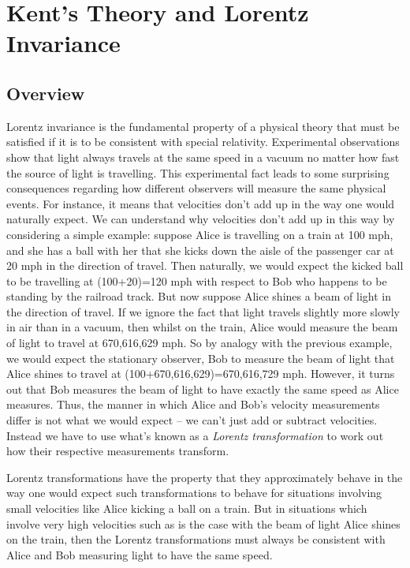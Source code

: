 \section{Kent's Theory and Lorentz Invariance\label{LorentzInvariance}}
\subsection{Overview}
Lorentz invariance is the fundamental property of a physical theory that must be satisfied if it is to be consistent with special relativity. Experimental observations show that light always travels at the same speed in a vacuum no matter how fast the source of light is travelling. This experimental fact leads to some surprising consequences regarding how different observers will measure the same physical events. For instance, it means that velocities don't add up in the way one would naturally expect. We can understand why velocities don't add up in this way by considering a simple example: suppose Alice is travelling on a train at 100 mph, and she has a ball with her that she kicks down the aisle of the passenger car at 20 mph in the direction of travel. Then naturally, we would expect the kicked ball to be travelling at (100+20)=120 mph with respect to Bob who happens to be standing by the railroad track.  But now suppose Alice shines a beam of light in the direction of travel. If we ignore the fact that light travels slightly more slowly in air than in a vacuum, then whilst on the train, Alice would measure the beam of light to travel at 670,616,629 mph. So by analogy with the previous example, we would expect the stationary observer, Bob to measure the beam of light that Alice shines to travel at (100+670,616,629)=670,616,729 mph. However, it turns out that Bob measures the beam of light to have exactly the same speed as Alice measures. Thus, the manner in which Alice and Bob's velocity measurements differ is not what we would expect -- we can't just add or subtract velocities. Instead we have to use what's known as a \emph{Lorentz transformation} to work out how their respective measurements transform. 

Lorentz transformations have the property that they approximately behave in the way one would expect such transformations to behave for situations involving small velocities like Alice kicking a ball on a train. But in situations which involve very high velocities such as is the case with the beam of light Alice shines on the train, then the Lorentz transformations must always be consistent with Alice and Bob measuring light to have the same speed. 


